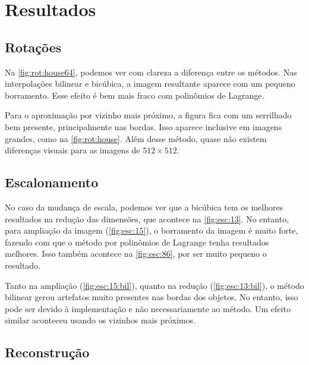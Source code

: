 \section{Resultados} \label{sec:resultados}

\subsection{Rotações}

    

    Na \cref{fig:rot:house64}, podemos ver com clareza a diferença entre os métodos. Nas interpolações bilinear e bicúbica, a imagem resultante aparece com um pequeno borramento. Esse efeito é bem mais fraco com polinômios de Lagrange.

    Para o aproximação por vizinho mais próximo, a figura fica com um serrilhado bem presente, principalmente nas bordas. Isso aparece inclusive em imagens grandes, como na \cref{fig:rot:house}. Além desse método, quase não existem diferenças visuais para as imagens de $512 \times 512$.

    

    

\subsection{Escalonamento}

    

    

    No caso da mudança de escala, podemos ver que a bicúbica tem os melhores resultados na redução das dimensões, que acontece na \cref{fig:esc:13}. No entanto, para ampliação da imagem (\cref{fig:esc:15}), o borramento da imagem é muito forte, fazendo com que o método por polinômios de Lagrange tenha resultados melhores. Isso também acontece na \cref{fig:esc:86}, por ser muito pequeno o resultado.

    Tanto na ampliação (\ref{fig:esc:15:bil}), quanto na redução (\ref{fig:esc:13:bil}), o método bilinear gerou artefatos muito presentes nas bordas dos objetos. No entanto, isso pode ser devido à implementação e não necessariamente ao método. Um efeito similar aconteceu usando os vizinhos mais próximos.

    

\subsection{Reconstrução}

